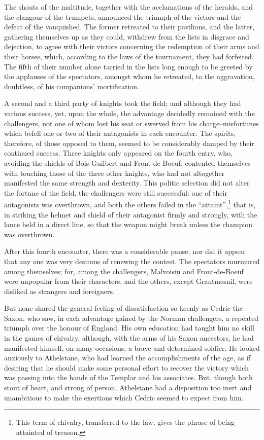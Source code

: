 The shouts of the multitude, together with the acclamations of the
heralds, and the clangour of the trumpets, announced the triumph of the
victors and the defeat of the vanquished. The former retreated to their
pavilions, and the latter, gathering themselves up as they could,
withdrew from the lists in disgrace and dejection, to agree with their
victors concerning the redemption of their arms and their horses, which,
according to the laws of the tournament, they had forfeited. The fifth
of their number alone tarried in the lists long enough to be greeted by
the applauses of the spectators, amongst whom he retreated, to the
aggravation, doubtless, of his companions' mortification.

A second and a third party of knights took the field; and although they
had various success, yet, upon the whole, the advantage decidedly
remained with the challengers, not one of whom lost his seat or swerved
from his charge--misfortunes which befell one or two of their
antagonists in each encounter. The spirits, therefore, of those opposed
to them, seemed to be considerably damped by their continued success.
Three knights only appeared on the fourth entry, who, avoiding the
shields of Bois-Guilbert and Front-de-Boeuf, contented themselves with
touching those of the three other knights, who had not altogether
manifested the same strength and dexterity. This politic selection did
not alter the fortune of the field, the challengers were still
successful: one of their antagonists was overthrown, and both the others
failed in the ``attaint'',\footnote{This term of chivalry, transferred to
the law, gives the
phrase of being attainted of treason.} that is, in striking the helmet and
shield of their antagonist firmly and strongly, with the lance held in a
direct line, so that the weapon might break unless the champion was
overthrown.

After this fourth encounter, there was a considerable pause; nor did it
appear that any one was very desirous of renewing the contest. The
spectators murmured among themselves; for, among the challengers,
Malvoisin and Front-de-Boeuf were unpopular from their characters, and
the others, except Grantmesnil, were disliked as strangers and
foreigners.

But none shared the general feeling of dissatisfaction so keenly as
Cedric the Saxon, who saw, in each advantage gained by the Norman
challengers, a repeated triumph over the honour of England. His own
education had taught him no skill in the games of chivalry, although,
with the arms of his Saxon ancestors, he had manifested himself, on many
occasions, a brave and determined soldier. He looked anxiously to
Athelstane, who had learned the accomplishments of the age, as if
desiring that he should make some personal effort to recover the victory
which was passing into the hands of the Templar and his associates. But,
though both stout of heart, and strong of person, Athelstane had a
disposition too inert and unambitious to make the exertions which Cedric
seemed to expect from him.

